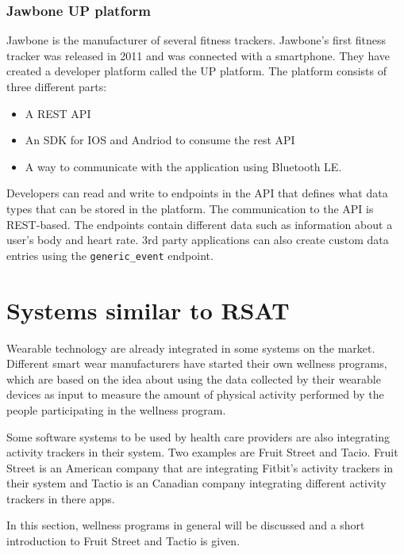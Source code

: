 \documentclass{cslthse-msc}
\begin{document}
\subsubsection{Jawbone UP platform}

Jawbone is the manufacturer of several fitness trackers. Jawbone's first fitness tracker was released in 2011 and was connected with a smartphone\cite{guo2013evaluation}. They have created a developer platform called the UP platform. The platform consists of three different parts\cite{JawboneDeveloper}:

\begin{itemize}
\item A REST API
\item An SDK for IOS and Andriod to consume the rest API
\item A way to communicate with the application using Bluetooth LE.
\end{itemize}

Developers can read and write to endpoints in the API that defines what data types that can be stored in the platform. The communication to the API is REST-based. The endpoints contain different data such as information about a user's body and heart rate. 3rd party applications can also create custom data entries using the \verb!generic_event! endpoint.\cite{JawboneCustomEndpoint}

\section{Systems similar to RSAT}

Wearable technology are already integrated in some systems on the market. Different smart wear manufacturers have started their own wellness programs, which are based on the idea about using the data collected by their wearable devices as input to measure the amount of physical activity performed by the people participating in the wellness program. 

Some software systems to be used by health care providers are also integrating activity trackers in their system. Two examples are Fruit Street and Tacio. Fruit Street is an American company that are integrating Fitbit's activity trackers in their system and Tactio is an Canadian company integrating different activity trackers in there apps.

In this section, wellness programs in general will be discussed and a short introduction to Fruit Street and Tactio is given. 
\end{document}
